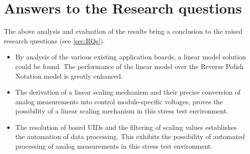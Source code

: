 \section{Answers to the Research questions}
The above analysis and evaluation of the results bring a conclusion to the raised research questions (see \cref{sec:RQs}).

\begin{itemize}
	\item By analysis of the various existing application boards, a linear model solution could be found.
		The performance of the linear model over the Reverse Polish Notation model is greatly enhanced. 
	\item The derivation of a linear scaling mechanism and their precise conversion of analog measurements into control module-specific voltages, proves the possibility of a linear scaling mechanism in this stress test environment. 
	\item The resolution of board UIDs and the filtering of scaling values establishes the automation of data processing.
		This exhibits the possibility of automated processing of analog measurements in this stress test environment.  
\end{itemize}
